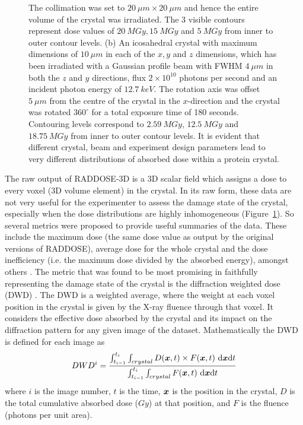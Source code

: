 \begin{figure}
{            The collimation was set to $20\ \mu m \times 20\ \mu m$ and hence the entire volume of the crystal was irradiated. The 3 visible contours represent dose values of $20\ MGy, 15\ MGy$ and $5\ MGy$ from inner to outer contour levels.
            (b) An icosahedral crystal with maximum dimensions of $10\ \mu m$ in each of the $x, y$ and $z$ dimensions, which has been irradiated with a Gaussian profile beam with FWHM $4\ \mu m$ in both the $z$ and $y$ directions, flux $2 \times 10^{10}$ photons per second and an incident photon energy of $12.7\ keV$. The rotation axis was offset $5\ \mu m$ from the centre of the crystal in the $x$-direction and the crystal was rotated $360^{\circ}$ for a total exposure time of 180 seconds. Contouring levels correspond to $2.59\ MGy$, $12.5\ MGy$ and $18.75\ MGy$ from inner to outer contour levels. It is evident that different crystal, beam and experiment design parameters lead to very different distributions of absorbed dose within a protein crystal.}
            \label{fig:RADDOSE-3D Polyhedral Crystal Examples}
        \end{figure}

        The raw output of RADDOSE-3D is a 3D scalar field which assigns a dose to every voxel (3D volume element) in the crystal.
        In its raw form, these data are not very useful for the experimenter to assess the damage state of the crystal, especially when the dose distributions are highly inhomogeneous (Figure~\ref{fig:RADDOSE-3D Polyhedral Crystal Examples}).
        So several metrics were proposed to provide useful summaries of the data.
        These include the maximum dose (the same dose value as output by the original versions of RADDOSE), average dose for the whole crystal and the dose inefficiency (i.e. the maximum dose divided by the absorbed energy), amongst others \cite{zeldin2012}.
        The metric that was found to be most promising in faithfully representing the damage state of the crystal is the diffraction weighted dose (DWD) \cite{zeldin2013dwd}. The DWD is a weighted average, where the weight at each voxel position in the crystal is given by the X-ray fluence through that voxel.
        It considers the effective dose absorbed by the crystal and its impact on the diffraction pattern for any given image of the dataset. Mathematically the DWD is defined for each image as
        \begin{equation}
            DWD^i = \f{\int_{t_{i-1}}^{t_i} \int_{crystal} D(\bs{x},t) \times F(\bs{x},t)\ \mathrm{d}\bs{x}\mathrm{d}t}{\int_{t_{i-1}}^{t_i} \int_{crystal} F(\bs{x},t)\ \mathrm{d}\bs{x}\mathrm{d}t}
        \end{equation}
        where $i$ is the image number, $t$ is the time, $\boldsymbol{x}$ is the position in the crystal, $D$ is the total cumulative absorbed dose ($Gy$) at that position, and $F$ is the fluence (photons per unit area).

